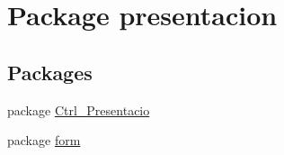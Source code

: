 \hypertarget{namespacepresentacion}{}\section{Package presentacion}
\label{namespacepresentacion}
\subsection*{Packages}
\begin{DoxyCompactItemize}
\item 
package \hyperlink{namespacepresentacion_1_1Ctrl__Presentacio}{Ctrl\+\_\+\+Presentacio}
\item 
package \hyperlink{namespacepresentacion_1_1form}{form}
\end{DoxyCompactItemize}
